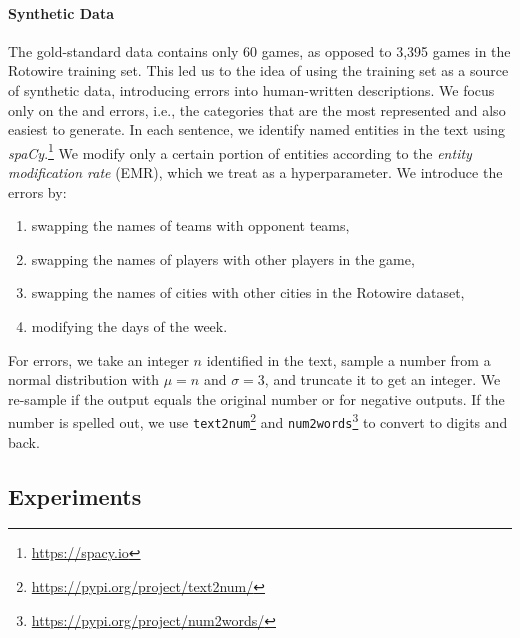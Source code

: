 \paragraph{Synthetic Data} The gold-standard data contains only 60 games, as opposed to 3,395 games in the Rotowire training set. This led us to the idea of using the training set as a source of synthetic data, introducing errors into human-written descriptions. We focus only on the  and  errors, i.e., the categories that are the most represented and also easiest to generate. In each sentence, we identify named entities in the text using \emph{spaCy}.\footnote{\url{https://spacy.io}} We modify only a certain portion of entities according to the \emph{entity modification rate} (EMR), which we treat as a hyperparameter. We introduce the  errors by:
\begin{enumerate}
    \item swapping the names of teams with opponent teams,
    \item swapping the names of players with other players in the game,
    \item swapping the names of cities with other cities in the Rotowire dataset,
    \item modifying the days of the week.
\end{enumerate}
For  errors, we take an integer $n$ identified in the text, sample a number from a normal distribution with $\mu=n$ and $\sigma=3$, and truncate it to get an integer. We re-sample if the output equals the original number or for negative outputs. If the number is spelled out, we use \texttt{text2num}\footnote{\url{https://pypi.org/project/text2num/}} and  \texttt{num2words}\footnote{\url{https://pypi.org/project/num2words/}} to convert to digits and back.


\subsection{Experiments}
\label{sec:tok-eval:experiments}

